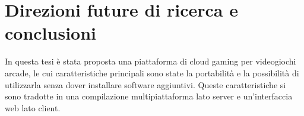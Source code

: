 %
%

\chapter*{Direzioni future di ricerca e conclusioni}




In questa tesi è stata proposta una piattaforma di cloud gaming per videogiochi arcade, le cui caratteristiche principali sono state la portabilità e la possibilità di utilizzarla senza dover installare software aggiuntivi. Queste caratteristiche si sono tradotte in una compilazione multipiattaforma lato server e un'interfaccia web lato client.

